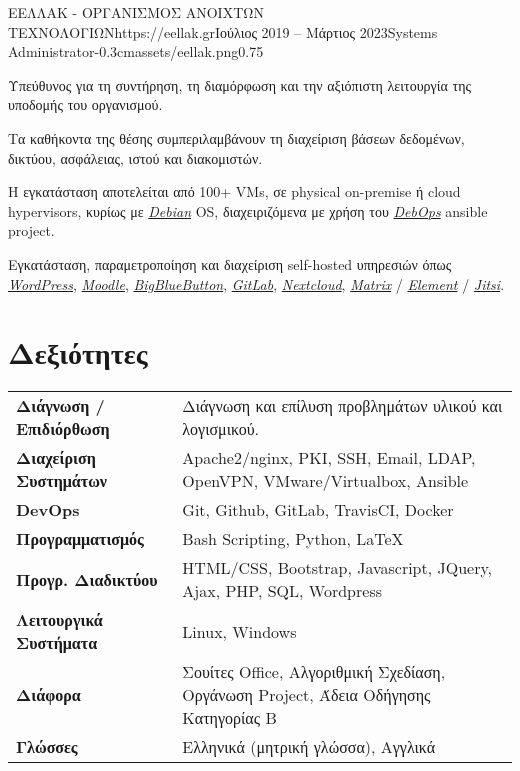 \documentclass{mycv}
\begin{document}
	\begin{EntryDatedLogo}{ΕΕΛΛΑΚ - ΟΡΓΑΝΙΣΜΟΣ ΑΝΟΙΧΤΩΝ ΤΕΧΝΟΛΟΓΙΩΝ}{https://eellak.gr}{Ιούλιος 2019 -- Μάρτιος 2023}{Systems Administrator}{-0.3cm}{assets/eellak.png}{0.75}
		\vspace{-0.2cm}
		\begin{Itemize}
			\item Υπεύθυνος για τη συντήρηση, τη διαμόρφωση και την αξιόπιστη λειτουργία της υποδομής του οργανισμού.
			\item Τα καθήκοντα της θέσης συμπεριλαμβάνουν τη διαχείριση βάσεων δεδομένων, δικτύου, ασφάλειας, ιστού και διακομιστών.
			\item Η εγκατάσταση αποτελείται από 100+ VMs, σε physical on-premise ή cloud hypervisors, κυρίως με \href{https://www.debian.org}{\textit{Debian}} OS, διαχειριζόμενα με χρήση του \href{https://debops.org}{\textit{DebOps}} ansible project.
			\item Εγκατάσταση, παραμετροποίηση και διαχείριση self-hosted υπηρεσιών όπως \href{https://wordpress.com}{\textit{WordPress}}, \href{https://moodle.org}{\textit{Moodle}}, \href{https://bigbluebutton.org}{\textit{BigBlueButton}}, \href{https://about.gitlab.com/install/}{\textit{GitLab}}, \href{https://nextcloud.com}{\textit{Nextcloud}}, \href{https://matrix.org}{\textit{Matrix}} / \href{https://element.io}{\textit{Element}} / \href{https://jitsi.org}{\textit{Jitsi}}.
		\end{Itemize}
	\end{EntryDatedLogo}

	\section{Δεξιότητες}
	\begin{tabular}{m{4.5cm} m{12.5cm}}
		\textbf{Διάγνωση / Επιδιόρθωση}     & Διάγνωση και επίλυση προβλημάτων υλικού και λογισμικού. \\
		\textbf{Διαχείριση Συστημάτων}		& Apache2/nginx, PKI, SSH, Email, LDAP, OpenVPN, VMware/Virtualbox, Ansible \\
		\textbf{DevOps}	                    & Git, Github, GitLab, TravisCI, Docker \\
		\textbf{Προγραμματισμός} 	 	  	& Bash Scripting, Python, \LaTeX \\
		\textbf{Προγρ. Διαδικτύου}	  		& HTML/CSS, Bootstrap, Javascript, JQuery, Ajax, PHP, SQL, Wordpress \\
		\textbf{Λειτουργικά Συστήματα}   	& Linux, Windows \\
		\textbf{Διάφορα}        		 	& Σουίτες Office, Αλγοριθμική Σχεδίαση, Οργάνωση Project, Άδεια Οδήγησης Κατηγορίας Β \\
		\textbf{Γλώσσες} 			   		& Ελληνικά (μητρική γλώσσα), Αγγλικά 
	\end{tabular}
\end{document}

